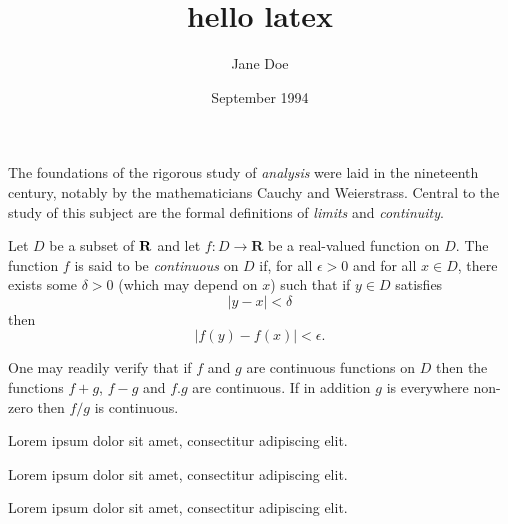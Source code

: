 \documentclass[a4paper,12pt]{article}
\title{hello latex}
\author{Jane Doe}
\date{September 1994}
\begin{document}
	\maketitle

The foundations of the rigorous study of \emph{analysis}
were laid in the nineteenth century, notably by the
mathematicians Cauchy and Weierstrass. Central to the
study of this subject are the formal definitions of
\emph{limits} and \emph{continuity}.

Let $D$ be a subset of $\bf R$ and let
$f \colon D \to \mathbf{R}$ be a real-valued function on
$D$. The function $f$ is said to be \emph{continuous} on
$D$ if, for all $\epsilon > 0$ and for all $x \in D$,
there exists some $\delta > 0$ (which may depend on $x$)
such that if $y \in D$ satisfies
\[ |y - x| < \delta \]
then
\[ |f(y) - f(x)| < \epsilon. \]

One may readily verify that if $f$ and $g$ are continuous
functions on $D$ then the functions $f+g$, $f-g$ and
$f.g$ are continuous. If in addition $g$ is everywhere
non-zero then $f/g$ is continuous.

\renewcommand{\familydefault}{\sfdefault}
Lorem ipsum dolor sit amet, consectitur adipiscing elit.
 
\renewcommand*\rmdefault{ppl}\normalfont\upshape
Lorem ipsum dolor sit amet, consectitur adipiscing elit. %
 
\renewcommand*\rmdefault{iwona}\normalfont\upshape
Lorem ipsum dolor sit amet, consectitur adipiscing elit. %
\end{document}
